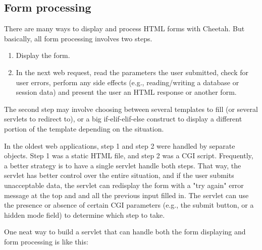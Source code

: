\subsection{Form processing}
\label{webware.form}

There are many ways to display and process HTML forms with Cheetah.
But basically, all form processing involves two steps.
\begin{enumerate}
\item{} Display the form.  
\item{} In the next web request, read the parameters the user submitted,
check for user errors, perform any side effects (e.g., reading/writing a
database or session data) and present the user an HTML response or another
form.  
\end{enumerate}

The second step may involve choosing between several templates to fill (or
several servlets to redirect to), or a big if-elif-elif-else construct to
display a different portion of the template depending on the situation.

In the oldest web applications, step 1 and step 2 were handled by separate
objects.  Step 1 was a static HTML file, and step 2 was a CGI script.
Frequently, a better strategy is to have a single servlet handle both steps.
That way, the servlet has better control over the entire situation, and if
the user submits unacceptable data, the servlet can redisplay the form with a
"try again" error message at the top and and all the previous input filled in.
The servlet can use the presence or absence of certain CGI parameters (e.g.,
the submit button, or a hidden mode field) to determine which step to take.

One neat way to build a servlet that can handle both the form displaying and
form processing is like this:

